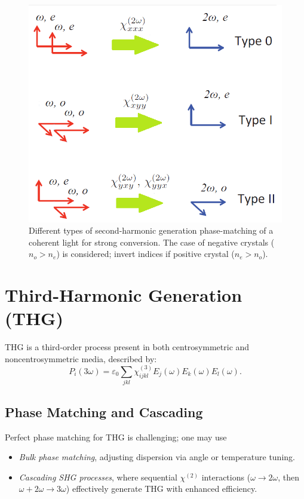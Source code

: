 \documentclass[9pt,a4paper,twocolumn,twoside]{tau-class/tau}
\begin{document}
\begin{figure}[h!]
\centering
\includegraphics[width=0.75\columnwidth]{figures/TypeX_SHG.png}
\caption{Different types of second-harmonic generation phase-matching of a coherent light for strong conversion. The case of negative crystals ($n_o > n_e$) is considered; invert indices if positive crystal ($n_e > n_o$). \cite{PhasemathingImage}}
\end{figure}

\section{Third-Harmonic Generation (THG)}
THG is a third-order process present in both centrosymmetric and noncentrosymmetric media, described by:
\begin{equation}
P_i(3\omega) = \varepsilon_0 \sum_{jkl} \chi^{(3)}_{ijkl} E_j(\omega)E_k(\omega)E_l(\omega).
\end{equation}

\subsection{Phase Matching and Cascading}
Perfect phase matching for THG is challenging; one may use
\begin{itemize}
\item \emph{Bulk phase matching}, adjusting dispersion via angle or temperature tuning.
\item \emph{Cascading SHG processes}, where sequential $\chi^{(2)}$ interactions ($\omega \to 2\omega$, then $\omega+2\omega \to 3\omega$) effectively generate THG with enhanced efficiency.
\end{itemize}
\end{document}
